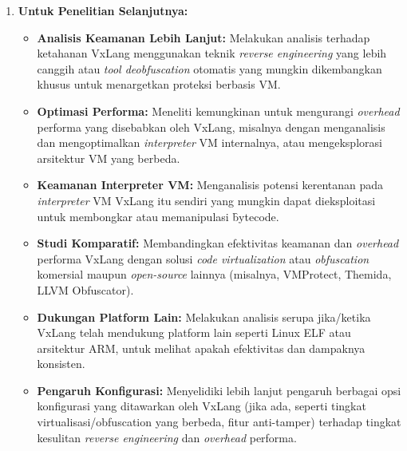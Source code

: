 \begin{enumerate}
    \item \textbf{Untuk Penelitian Selanjutnya:}
        \begin{itemize}
            \item \textbf{Analisis Keamanan Lebih Lanjut:} Melakukan analisis terhadap ketahanan VxLang menggunakan teknik \textit{reverse engineering} yang lebih canggih atau \textit{tool deobfuscation} otomatis yang mungkin dikembangkan khusus untuk menargetkan proteksi berbasis VM.
            \item \textbf{Optimasi Performa:} Meneliti kemungkinan untuk mengurangi \textit{overhead} performa yang disebabkan oleh VxLang, misalnya dengan menganalisis dan mengoptimalkan \textit{interpreter} VM internalnya, atau mengeksplorasi arsitektur VM yang berbeda.
            \item \textbf{Keamanan Interpreter VM:} Menganalisis potensi kerentanan pada \textit{interpreter} VM VxLang itu sendiri yang mungkin dapat dieksploitasi untuk membongkar atau memanipulasi \f{bytecode}.
            \item \textbf{Studi Komparatif:} Membandingkan efektivitas keamanan dan \textit{overhead} performa VxLang dengan solusi \textit{code virtualization} atau \textit{obfuscation} komersial maupun \textit{open-source} lainnya (misalnya, VMProtect, Themida, LLVM Obfuscator).
            \item \textbf{Dukungan Platform Lain:} Melakukan analisis serupa jika/ketika VxLang telah mendukung platform lain seperti Linux ELF atau arsitektur ARM, untuk melihat apakah efektivitas dan dampaknya konsisten.
            \item \textbf{Pengaruh Konfigurasi:} Menyelidiki lebih lanjut pengaruh berbagai opsi konfigurasi yang ditawarkan oleh VxLang (jika ada, seperti tingkat virtualisasi/obfuscation yang berbeda, fitur anti-tamper) terhadap tingkat kesulitan \textit{reverse engineering} dan \textit{overhead} performa.
        \end{itemize}
\end{enumerate}
